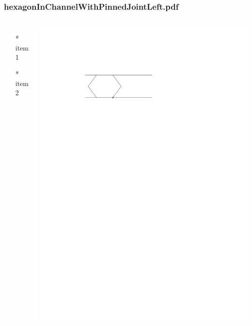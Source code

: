 \begin{frame} \frametitle{hexagonInChannelWithPinnedJointLeft.pdf}
    \begin{columns}[c]
        \begin{itemize}
            \item[*] item 1
            \item[*] item 2
        \end{itemize}
        \begin{minipage}{\linewidth}
            \begin{center}
            \includegraphics[width=.9\textwidth]{graphics/hexagonInChannelWithPinnedJointLeft.pdf}
            \label{gfx:hexagonInChannelWithPinnedJointLeft.pdf}
            \end{center}
        \end{minipage}
    \end{columns}
\end{frame}
